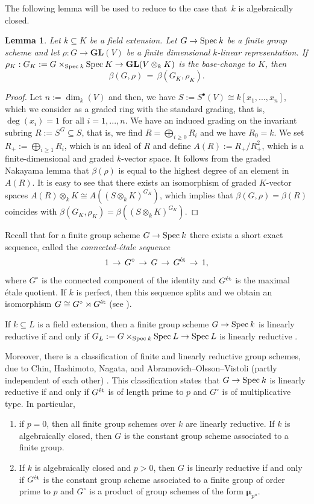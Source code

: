 \documentclass[reqno]{amsart}
\newcommand{\Spec}{{\rm Spec}\:}
\newcommand{\GL}{{\mathbf{GL}}}
\newcommand{\et}{{\rm \acute{e}t}}
\newcommand{\bmu}{\boldsymbol{\mu}}
\theoremstyle{definition}
\theoremstyle{plain}
\newtheorem{Lemma}[Definition]{Lemma}
\begin{document}
The following lemma will be used to reduce to the case that~$k$ is algebraically closed.

\begin{Lemma}
\label{lem: reduce to kbar}
 Let $k\subseteq K$ be a field extension.
 Let $G\to\Spec k$ be a finite group scheme and let $\rho:G\to\GL(V)$ be a finite
 dimensional $k$-linear representation.
 If $\rho_K:G_K:=G\times_{\Spec k}\Spec K\to\GL(V\otimes_kK)$
 is the base-change to $K$, then
 $$
   \beta(G,\rho) \,=\, \beta(G_K,\rho_K).
 $$
\end{Lemma}

\begin{proof}
Let $n:=\dim_k(V)$ and then, we have $S:=S^\bullet(V)\cong k[x_1,...,x_n]$,
which we consider as a graded ring with the standard grading, that is, 
$\deg(x_i)=1$ for all $i=1,...,n$.
We have an induced grading on the invariant subring
$R:=S^G\subseteq S$, that is, we find
$R=\bigoplus_{i\geq 0} R_i$ and we have $R_0=k$.
We set $R_+:=\bigoplus_{i\geq1}R_i$, which is an ideal of $R$ 
and define $A(R):=R_+/R_+^2$, which is a finite-dimensional and 
graded $k$-vector space.
It follows from the graded Nakayama lemma that 
$\beta(\rho)$ is equal to the highest degree of an element in $A(R)$.
It is easy to see that there exists an isomorphism of graded $K$-vector
spaces $A(R)\otimes_kK\cong A((S\otimes_kK)^{G_K})$, which implies
that $\beta(G,\rho)=\beta(R)$ coincides with $\beta(G_K,\rho_K)=\beta((S\otimes_kK)^{G_K})$.
\end{proof}

Recall that for a finite group scheme $G\to\Spec k$
there exists a short exact sequence,
called the \emph{connected-\'etale sequence}
$$
1\,\to\,G^\circ\,\to\,G\,\to\,G^{\et}\,\to\,1,
$$
where $G^\circ$ is the connected component of
the identity and $G^\et$ is the maximal \'etale quotient.
If $k$ is perfect, then this sequence splits and 
we obtain an isomorphism $G\cong G^\circ\rtimes G^\et$ (see \cite[Theorem~1.3.13]{Brion}).

If $k\subseteq L$ is a field extension, then a finite group
scheme $G\to\Spec k$ is linearly reductive if and only
if $G_L:=G\times_{\Spec k}\Spec L\to\Spec L$ is linearly
reductive \cite[Proposition 2.4]{AOV}.

Moreover, there is a classification of finite and linearly
reductive group schemes, due to Chin, Hashimoto,
Nagata, and Abramovich--Olsson--Vistoli
(partly independent of each other) 
\cite{Chin, Hashimoto, Nagata, AOV}.
This classification states that $G\to\Spec k$
is linearly reductive if and only if $G^\et$ is of
length prime to $p$ and $G^\circ$ is
of multiplicative type.
In particular,
\begin{enumerate}
\item if $p=0$, then all finite
group schemes over $k$ are linearly reductive.
If $k$ is algebraically closed, then $G$ is the constant
group scheme associated to a finite group.
\item If $k$ is algebraically closed and $p>0$, 
then $G$ is linearly reductive if and only if 
 $G^\et$ is the constant group 
scheme associated to a finite group of order prime to
$p$ and $G^\circ$ is a product of 
group schemes of the form $\bmu_{p^n}$.
\end{enumerate}
\end{document}
